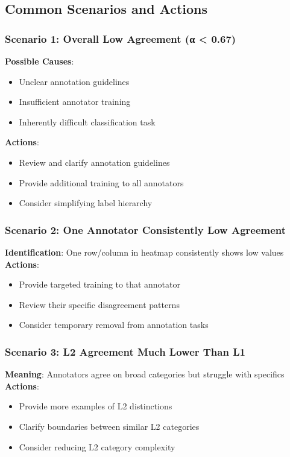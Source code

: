 \documentclass[11pt]{article}
\begin{document}
\subsection{Common Scenarios and Actions}

\subsubsection{Scenario 1: Overall Low Agreement (α < 0.67)}
\textbf{Possible Causes}:
\begin{itemize}
\item Unclear annotation guidelines
\item Insufficient annotator training
\item Inherently difficult classification task
\end{itemize}
\textbf{Actions}:
\begin{itemize}
\item Review and clarify annotation guidelines
\item Provide additional training to all annotators
\item Consider simplifying label hierarchy
\end{itemize}

\subsubsection{Scenario 2: One Annotator Consistently Low Agreement}
\textbf{Identification}: One row/column in heatmap consistently shows low values
\textbf{Actions}:
\begin{itemize}
\item Provide targeted training to that annotator
\item Review their specific disagreement patterns
\item Consider temporary removal from annotation tasks
\end{itemize}

\subsubsection{Scenario 3: L2 Agreement Much Lower Than L1}
\textbf{Meaning}: Annotators agree on broad categories but struggle with specifics
\textbf{Actions}:
\begin{itemize}
\item Provide more examples of L2 distinctions
\item Clarify boundaries between similar L2 categories
\item Consider reducing L2 category complexity
\end{itemize}
\end{document}

